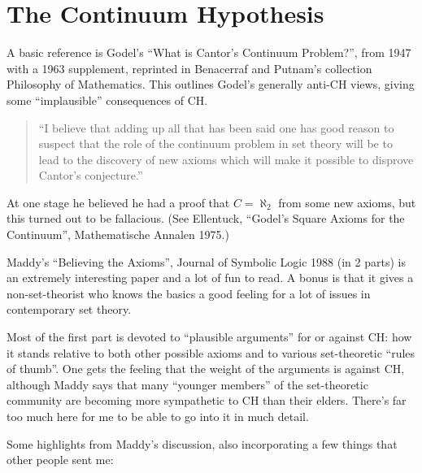 \section{The Continuum Hypothesis}
A basic reference is Godel's ``What is Cantor's Continuum Problem?'',
from 1947 with a 1963 supplement, reprinted in Benacerraf and Putnam's
collection Philosophy of Mathematics.  This outlines Godel's generally
anti-CH views, giving some ``implausible'' consequences of CH.

\begin{quote}
  ``I believe that adding up all that has been said one has good reason
  to suspect that the role of the continuum problem in set theory will
  be to lead to the discovery of new axioms which will make it possible
  to disprove Cantor's conjecture.''
\end{quote}

At one stage he believed he had a proof that $C = \aleph_2$ from some
new axioms, but this turned out to be fallacious.  (See Ellentuck,
``Godel's Square Axioms for the Continuum'', Mathematische Annalen
1975.)

Maddy's ``Believing the Axioms'', Journal of Symbolic Logic 1988 (in 2
parts) is an extremely interesting paper and a lot of fun to read.  A
bonus is that it gives a non-set-theorist who knows the basics a good
feeling for a lot of issues in contemporary set theory.

Most of the first part is devoted to ``plausible arguments'' for or
against CH: how it stands relative to both other possible axioms and to
various set-theoretic ``rules of thumb''.  One gets the feeling that the
weight of the arguments is against CH, although Maddy says that many
``younger members'' of the set-theoretic community are becoming more
sympathetic to CH than their elders.  There's far too much here for me
to be able to go into it in much detail.

Some highlights from Maddy's discussion, also incorporating a few things
that other people sent me:

